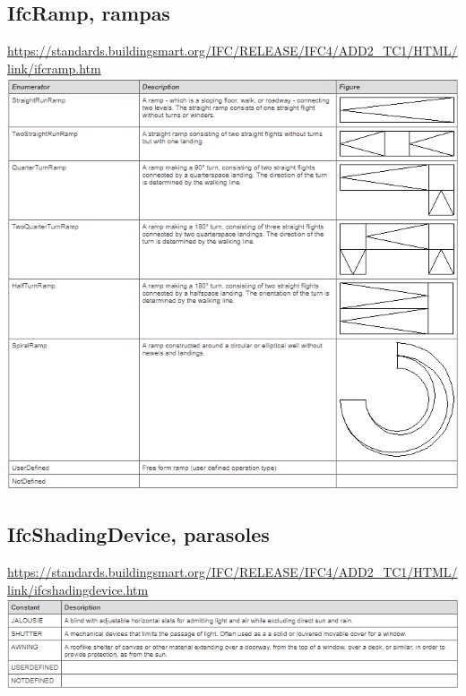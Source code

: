\documentclass[spanish,12pt,a4paper,final,oneside]{book}
\begin{document}
\subsection{IfcRamp, rampas}
\url{https://standards.buildingsmart.org/IFC/RELEASE/IFC4/ADD2_TC1/HTML/link/ifcramp.htm}
\\ \includegraphics[width=\textwidth]{Definicion de IfcRampTypeEnum}

\subsection{IfcShadingDevice, parasoles}
\url{https://standards.buildingsmart.org/IFC/RELEASE/IFC4/ADD2_TC1/HTML/link/ifcshadingdevice.htm}
\\ \includegraphics[width=\textwidth]{Definicion de IfcShadingDeviceTypeEnum}
\end{document}
